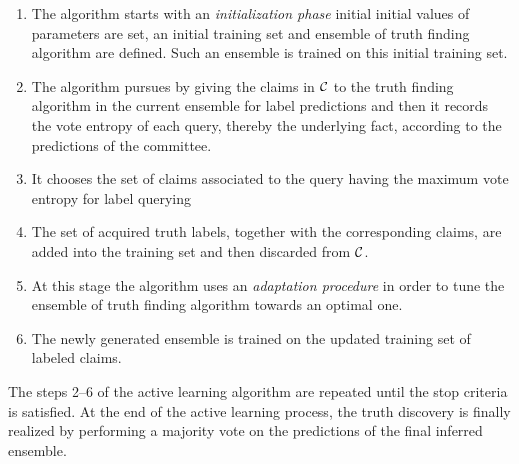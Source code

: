 \begin{enumerate}
\item The algorithm starts with an \emph{initialization phase} initial initial values of parameters are set, an initial training set and ensemble of truth finding
algorithm are defined. Such an ensemble is trained on this initial training set.
 \item The algorithm pursues by giving the claims in $\mathcal{C}{}$ to the truth finding algorithm in the current ensemble for label predictions and then 
 it records the vote entropy of each query, thereby the underlying fact, according to the predictions of the committee.
 \item It chooses the set of claims associated to the query having the maximum vote entropy for label querying
 \item The set of acquired truth labels, together with the corresponding claims, are added into the training set and then discarded from $\mathcal{C}{}$.
 \item At this stage the algorithm uses an \emph{adaptation procedure} in order to tune the ensemble of truth finding algorithm towards an optimal one.
 \item The newly generated ensemble is trained on the updated training set of labeled claims.
\end{enumerate}

The steps 2--6 of the active learning algorithm are repeated until the stop criteria is satisfied. 
At the end of the active learning process, the truth discovery is finally realized by performing 
a majority vote on the predictions of the final inferred ensemble. 

